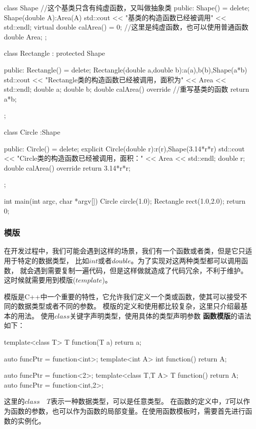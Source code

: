 \begin{tcode}
class Shape {//这个基类只含有纯虚函数，又叫做抽象类
public:
    Shape() = delete;
    Shape(double A):Area(A)
    {std::cout << "基类的构造函数已经被调用" << std::endl;}
    virtual double calArea() = 0; //这里是纯虚函数，也可以使用普通函数
    double Area;
};

class Rectangle
        : protected Shape{
public:
    Rectangle() = delete;
    Rectangle(double a,double b):a(a),b(b),Shape(a*b)
    {std::cout << "Rectangle类的构造函数已经被调用，面积为" << Area << std::endl;}
    double a;
    double b;
    double calArea() override{  //重写基类的函数
        return a*b;
    }

};

class Circle
        :Shape{
public:
    Circle() = delete;
    explicit Circle(double r):r(r),Shape(3.14*r*r)
    {std::cout << "Circle类的构造函数已经被调用，面积：" << Area << std::endl;}
    double r;
    double calArea() override{
        return 3.14*r*r;
    }

};

int main(int argc, char *argv[]) {
    Circle circle(1.0);
    Rectangle rect(1.0,2.0);
    return 0;
}
\end{tcode}


 \subsubsection{模版}
在开发过程中，我们可能会遇到这样的场景，我们有一个函数或者类，但是它只适用于特定的数据类型，
比如$int$或者$double$。为了实现对这两种类型都可以调用函数，
就会遇到需要复制一遍代码，但是这样做就造成了代码冗余，不利于维护。这时候就需要用到模版($template$)。

模版是C++中一个重要的特性，它允许我们定义一个类或函数，使其可以接受不同的数据类型或者不同的参数。
模版的定义和使用都比较复杂，这里只介绍最基本的用法。
使用$class$关键字声明类型，使用具体的类型声明参数
\textbf{函数模版}的语法如下：
\begin{tcode}
template<class T>
T function(T a){
    return a;
}

auto funcPtr = function<int>;
template<int A>
int function(){
 return A;
}

auto funcPtr = function<2>;
template<class T,T A>
T function(){
 return A;
}
auto funcPtr = function<int,2>;
\end{tcode}

 这里的$class \quad T$表示一种数据类型，可以是任意类型。
 在函数的定义中，$T$可以作为函数的参数，也可以作为函数的局部变量。在使用函数模板时，需要首先进行函数的实例化。

